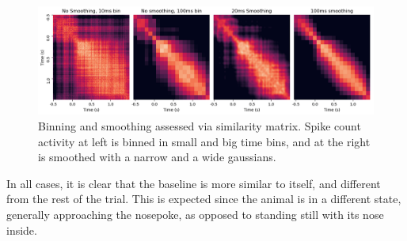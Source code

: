 \begin{figure}
    \centering
    \includegraphics[width=\textwidth]{figures/similarity_comparison.png}
    \caption[Binning and smoothing assessed via similarity matrix]{Binning and smoothing assessed via similarity matrix. Spike count activity at left is binned in small and big time bins, and at the right is smoothed with a narrow and a wide gaussians.}
    \label{fig:mahalanobis_smoothing} 
\end{figure} %
    
    
    In all cases, it is clear that the baseline is more similar to itself, and different from the rest of the trial. This is expected since the animal is in a different state, generally approaching the nosepoke, as opposed to standing still with its nose inside. 

